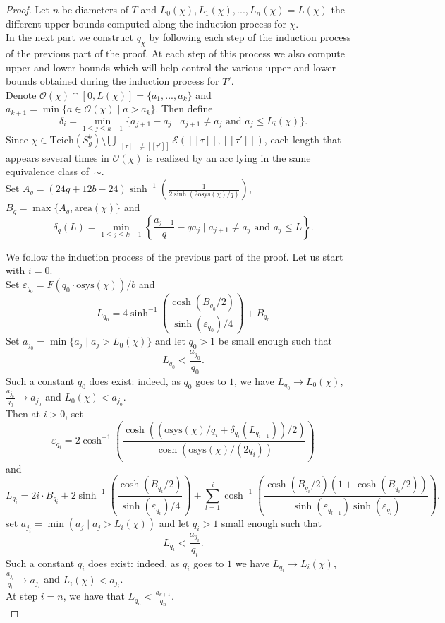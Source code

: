\documentclass[a4paper,12pt]{article}
\theoremstyle{definition}
\theoremstyle{remark}
\begin{document}
\begin{proof}
    Let $n$ be diameters of $T$ and $L_{0}(\chi), L_{1}(\chi),...,L_{n}(\chi)=L(\chi)$ the different upper bounds computed along the induction process for $\chi$. \\
    
    In the next part we construct $q_\chi$ by following each step of the induction process of the previous part of the proof. At each step of this process we also compute upper and lower bounds which will help control the various upper and lower bounds obtained during the induction process for $\Upsilon'$.\\
    

    Denote $\mathcal{O}(\chi)\cap [0,L(\chi)]=\{a_1,...,a_k\}$ and $a_{k+1}=\min\{ a \in \mathcal{O}(\chi) \mid a > a_k\}$. 
    Then define 
    \[
        \delta_i= \min_{1 \leqslant j \leqslant k-1}\{a_{j+1}-a_j \mid a_{j+1} \neq a_j \mbox{ and } a_j \leqslant L_i(\chi)\}. 
    \]
    Since $\chi \in \mathrm{Teich}(S_g^b) \setminus \bigcup_{[[\tau]]\neq [[\tau']]} \mathcal{E}([[\tau]],[[\tau']])$, each length that appears several times in $\mathcal{O}(\chi)$ is realized by an arc lying in the same equivalence class of~$\sim$.  \\
    
    Set $A_q = (24g+12b-24) \sinh^{-1}\left( \frac{1}{2\sinh(2 \mathrm{osys}(\chi)/q)} \right)$, $B_q=\max\{ A_q, \mathrm{area}(\chi)\}$ and
    \[
        \delta_q(L)=\min_{1 \leqslant j \leqslant k-1}\left\{\frac{a_{j+1}}{q}-qa_j \mid a_{j+1}\neq a_j \mbox{ and } a_j \leqslant L\right\}.
    \]
    
    
    We follow the induction process of the previous part of the proof. Let us start with $i=0$.\\
    Set $\varepsilon_{q_0}=F(q_0\cdot \mathrm{osys}(\chi))/b$ and
    \[
        L_{q_0}= 4\sinh^{-1} \left( \frac{\cosh(B_{q_0}/2)}{\sinh(\varepsilon_{q_0})/4} \right) +B_{q_0}
    \]
    Set $a_{j_0}=\min\{ a_j \mid a_j > L_{0}(\chi) \}$ and let $q_0>1$ be small enough such that 
    \[ 
         L_{q_0}<\frac{a_{j_0}}{q_0}.
    \]
    Such a constant $q_0$ does exist: indeed, as $q_0$ goes to $1$, we have $L_{q_0} \to L_0(\chi)$, $\frac{a_{j_0}}{q_0} \to a_{j_0}$ and $L_0(\chi) < a_{j_0}$.\\
    Then at $i>0$, set
    \[
        \varepsilon_{q_{i}} = 2\cosh^{-1} \left( \frac{   \cosh( (\mathrm{osys}(\chi)/q_{i} + \delta_{q_{i}}(L_{q_{i-1}}) )/2 ) }{  \cosh( \mathrm{osys}(\chi)/(2q_{i}))}  \right)
    \]
    and
    \[
        L_{q_{i}} = 2i\cdot B_{q_{i}} + 2\sinh^{-1}\left( \frac{\cosh(B_{q_{i}}/2)}{\sinh(\varepsilon_{q_{i}})/4} \right) + \sum_{l=1}^{i} \cosh^{-1} \left(  \frac{ \cosh(B_{q_{i}}/2)(1+\cosh(B_{q_{i}}/2))  }{ \sinh(\varepsilon_{q_{l-1}})\sinh(\varepsilon_{q_l}) } \right).
    \]
    set $a_{j_{i}}= \min( a_j \mid a_j > L_{i}(\chi) ) $ and let $q_{i}>1$ small enough such that 
    \[ 
         L_{q_{i}}<\frac{a_{j_{i}}}{q_{i}}. 
    \]
    Such a constant $q_{i}$ does exist: indeed, as $q_{i}$ goes to $1$ we have $L_{q_{i}} \to L_{i}(\chi)$, $\frac{a_{j_{i}}}{q_{i}} \to a_{j_{i}}$ and $L_{i}(\chi) < a_{j_{i}}$.\\
    At step $i=n$, we have that $L_{q_n}<\frac{a_{k+1}}{q_n}$.\\
    

\end{proof}
\end{document}
